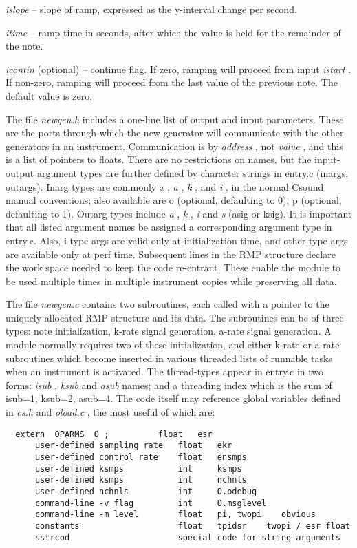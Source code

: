  \emph{islope}
 -- slope of ramp, expressed as the y-interval change per second. 


 \emph{itime}
 -- ramp time in seconds, after which the value is held for the remainder of the note. 


 \emph{icontin}
 (optional) -- continue flag. If zero, ramping will proceed from input \emph{istart}
 . If non-zero, ramping will proceed from the last value of the previous note. The default value is zero. 


  The file \emph{newgen.h}
 includes a one-line list of output and input parameters. These are the ports through which the new generator will communicate with the other generators in an instrument. Communication is by \emph{address}
, not \emph{value}
, and this is a list of pointers to floats. There are no restrictions on names, but the input-output argument types are further defined by character strings in entry.c (inargs, outargs). Inarg types are commonly \emph{x}
, \emph{a}
, \emph{k}
, and \emph{i}
, in the normal Csound manual conventions; also available are o (optional, defaulting to 0), p (optional, defaulting to 1). Outarg types include \emph{a}
, \emph{k}
, \emph{i}
 and \emph{s}
 (asig or ksig). It is important that all listed argument names be assigned a corresponding argument type in entry.c. Also, i-type args are valid only at initialization time, and other-type args are available only at perf time. Subsequent lines in the RMP structure declare the work space needed to keep the code re-entrant. These enable the module to be used multiple times in multiple instrument copies while preserving all data. 


  The file \emph{newgen.c}
 contains two subroutines, each called with a pointer to the uniquely allocated RMP structure and its data. The subroutines can be of three types: note initialization, k-rate signal generation, a-rate signal generation. A module normally requires two of these initialization, and either k-rate or a-rate subroutines which become inserted in various threaded lists of runnable tasks when an instrument is activated. The thread-types appear in entry.c in two forms: \emph{isub}
, \emph{ksub}
 and \emph{asub}
 names; and a threading index which is the sum of isub=1, ksub=2, asub=4. The code itself may reference global variables defined in \emph{cs.h}
 and \emph{oload.c}
, the most useful of which are: 


 
\begin{lstlisting}
  extern  OPARMS  O ;          float   esr
      user-defined sampling rate   float   ekr
      user-defined control rate    float   ensmps
      user-defined ksmps           int     ksmps
      user-defined ksmps           int     nchnls
      user-defined nchnls          int     O.odebug
      command-line -v flag         int     O.msglevel
      command-line -m level        float   pi, twopi    obvious
      constants                    float   tpidsr    twopi / esr float
      sstrcod                      special code for string arguments
      
\end{lstlisting}


